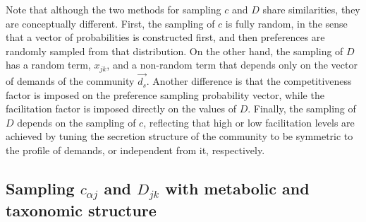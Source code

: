 \documentclass[12pt]{article}
\begin{document}
        	Note that although the two methods for sampling $ c $ and $ D $ share similarities, they are conceptually different. First, the sampling of $ c $ is fully random, in the sense that a vector of probabilities is constructed first, and then preferences are randomly sampled from that distribution. On the other hand, the sampling of $ D $ has a random term, $ x_{jk} $, and a non-random term that depends only on the vector of demands of the community $ \vec{d_s} $. Another difference is that the competitiveness factor is imposed on the preference sampling probability vector, while the facilitation factor is imposed directly on the values of $ D $. Finally, the sampling of $ D $ depends on the sampling of $ c $, reflecting that high or low facilitation levels are achieved by tuning the secretion structure of the community to be symmetric to the profile of demands, or independent from it, respectively.
    	
    	\subsection{Sampling $ c_{{\alpha}j} $ and $ D_{jk }$ with metabolic and taxonomic structure}
        	
\end{document}
